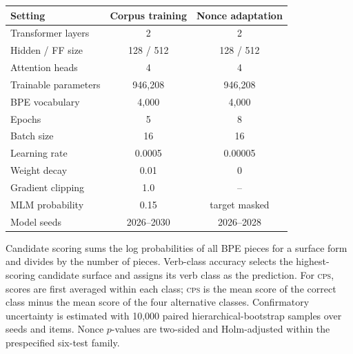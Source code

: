 \documentclass[11pt]{article}
\newcommand{\cps}{\textsc{cps}}
\begin{document}
\begin{center}
  \small
  \setlength{\tabcolsep}{3.5pt}
  \begin{tabular}{@{}lcc@{}}
    \toprule
    Setting & Corpus training & Nonce adaptation \\
    \midrule
    Transformer layers & 2 & 2 \\
    Hidden / FF size & 128 / 512 & 128 / 512 \\
    Attention heads & 4 & 4 \\
    Trainable parameters & 946,208 & 946,208 \\
    BPE vocabulary & 4,000 & 4,000 \\
    Epochs & 5 & 8 \\
    Batch size & 16 & 16 \\
    Learning rate & 0.0005 & 0.00005 \\
    Weight decay & 0.01 & 0 \\
    Gradient clipping & 1.0 & -- \\
    MLM probability & 0.15 & target masked \\
    Model seeds & 2026--2030 & 2026--2028 \\
    \bottomrule
  \end{tabular}
  \label{tab:appendix-training}
\end{center}

Candidate scoring sums the log probabilities of all BPE pieces for a surface form and divides by the number of pieces. Verb-class accuracy selects the highest-scoring candidate surface and assigns its verb class as the prediction. For \cps{}, scores are first averaged within each class; \cps{} is the mean score of the correct class minus the mean score of the four alternative classes. Confirmatory uncertainty is estimated with 10,000 paired hierarchical-bootstrap samples over seeds and items. Nonce $p$-values are two-sided and Holm-adjusted within the prespecified six-test family.
\end{document}
